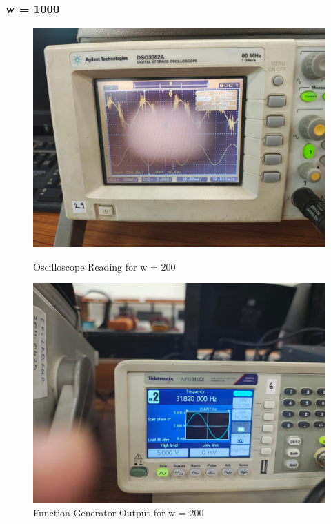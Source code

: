 \documentclass[a4paper,12pt]{article}
\begin{document}
\subsubsection{w = 1000}
\begin{figure}[H]
    \centering
    \begin{minipage}{0.48\textwidth}
        \centering
        \includegraphics[width=\textwidth]{fig/3w200o.jpeg} %
        \caption{Oscilloscope Reading for w = 200}
    \end{minipage}
    \hfill
    \begin{minipage}{0.48\textwidth}
        \centering
        \includegraphics[width=\textwidth]{fig/3w200.jpeg} %
        \caption{Function Generator Output for w = 200}
    \end{minipage}
\end{figure}
\end{document}
